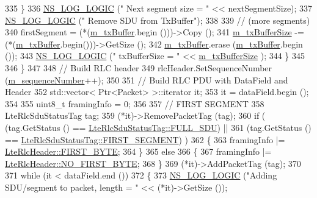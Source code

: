 \begin{DoxyCode}
335             \}
336           \hyperlink{group__logging_ga88acd260151caf2db9c0fc84997f45ce}{NS\_LOG\_LOGIC} (\textcolor{stringliteral}{"        Next segment size = "} << nextSegmentSize);
337           \hyperlink{group__logging_ga88acd260151caf2db9c0fc84997f45ce}{NS\_LOG\_LOGIC} (\textcolor{stringliteral}{"        Remove SDU from TxBuffer"});
338 
339           \textcolor{comment}{// (more segments)}
340           firstSegment = (*(\hyperlink{classns3_1_1LteRlcUm_ac2c10aa57585dbea3797d651f3dce7be}{m\_txBuffer}.begin ()))->Copy ();
341           \hyperlink{classns3_1_1LteRlcUm_a22ba9f6bd98fd3b905155ae0d0182b0d}{m\_txBufferSize} -= (*(\hyperlink{classns3_1_1LteRlcUm_ac2c10aa57585dbea3797d651f3dce7be}{m\_txBuffer}.begin()))->GetSize ();
342           \hyperlink{classns3_1_1LteRlcUm_ac2c10aa57585dbea3797d651f3dce7be}{m\_txBuffer}.erase (\hyperlink{classns3_1_1LteRlcUm_ac2c10aa57585dbea3797d651f3dce7be}{m\_txBuffer}.begin ());
343           \hyperlink{group__logging_ga88acd260151caf2db9c0fc84997f45ce}{NS\_LOG\_LOGIC} (\textcolor{stringliteral}{"        txBufferSize = "} << \hyperlink{classns3_1_1LteRlcUm_a22ba9f6bd98fd3b905155ae0d0182b0d}{m\_txBufferSize} );
344         \}
345 
346     \}
347 
348   \textcolor{comment}{// Build RLC header}
349   rlcHeader.SetSequenceNumber (\hyperlink{classns3_1_1LteRlcUm_afd06062cf128aecdc2f7c3f29ea8a8ad}{m\_sequenceNumber}++);
350 
351   \textcolor{comment}{// Build RLC PDU with DataField and Header}
352   std::vector< Ptr<Packet> >::iterator it;
353   it = dataField.begin ();
354 
355   uint8\_t framingInfo = 0;
356 
357   \textcolor{comment}{// FIRST SEGMENT}
358   LteRlcSduStatusTag tag;
359   (*it)->RemovePacketTag (tag);
360   \textcolor{keywordflow}{if} ( (tag.GetStatus () == \hyperlink{classns3_1_1LteRlcSduStatusTag_ae7822c5cc0d54a3d193b09a91ed6f133ade41b0025c66cd211e992196f314d4a5}{LteRlcSduStatusTag::FULL\_SDU}) ||
361         (tag.GetStatus () == \hyperlink{classns3_1_1LteRlcSduStatusTag_ae7822c5cc0d54a3d193b09a91ed6f133afda65e6233ba6fd1cd8aacf54cd11269}{LteRlcSduStatusTag::FIRST\_SEGMENT}) )
362     \{
363       framingInfo |= \hyperlink{classns3_1_1LteRlcHeader_a9bfac53b015df1fd1fe649764534b0deaa3a14c19603556ac2ead7440fd6d54ba}{LteRlcHeader::FIRST\_BYTE};
364     \}
365   \textcolor{keywordflow}{else}
366     \{
367       framingInfo |= \hyperlink{classns3_1_1LteRlcHeader_a9bfac53b015df1fd1fe649764534b0dea610c4bd2a31d4896f4bb1d08cb96dfbb}{LteRlcHeader::NO\_FIRST\_BYTE};
368     \}
369   (*it)->AddPacketTag (tag);
370 
371   \textcolor{keywordflow}{while} (it < dataField.end ())
372     \{
373       \hyperlink{group__logging_ga88acd260151caf2db9c0fc84997f45ce}{NS\_LOG\_LOGIC} (\textcolor{stringliteral}{"Adding SDU/segment to packet, length = "} << (*it)->GetSize ());

\end{DoxyCode}
